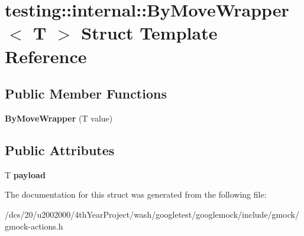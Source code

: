\hypertarget{structtesting_1_1internal_1_1ByMoveWrapper}{}\section{testing\+:\+:internal\+:\+:By\+Move\+Wrapper$<$ T $>$ Struct Template Reference}
\label{structtesting_1_1internal_1_1ByMoveWrapper}
\subsection*{Public Member Functions}
\begin{DoxyCompactItemize}
\item 
\mbox{\label{structtesting_1_1internal_1_1ByMoveWrapper_a60df33395785e0bfc5f72fba32376349}} 
{\bfseries By\+Move\+Wrapper} (T value)
\end{DoxyCompactItemize}
\subsection*{Public Attributes}
\begin{DoxyCompactItemize}
\item 
\mbox{\label{structtesting_1_1internal_1_1ByMoveWrapper_ae8407b1ae99db3f00797d68b9ee9e870}} 
T {\bfseries payload}
\end{DoxyCompactItemize}


The documentation for this struct was generated from the following file\+:\begin{DoxyCompactItemize}
\item 
/dcs/20/u2002000/4th\+Year\+Project/wash/googletest/googlemock/include/gmock/gmock-\/actions.\+h\end{DoxyCompactItemize}
